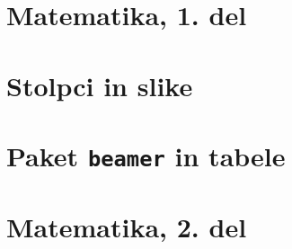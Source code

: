 \documentclass{beamer}
\begin{document}
\section[Matematika, 1. del\\\large{Analiza, logika, množice}]{Matematika, 1. del}

\section{Stolpci in slike}

\section{Paket \texttt{beamer} in tabele}

\section[Matematika, 2. del\\\large{Zaporedja, algebra, grupe}]{Matematika, 2. del}
\end{document}
